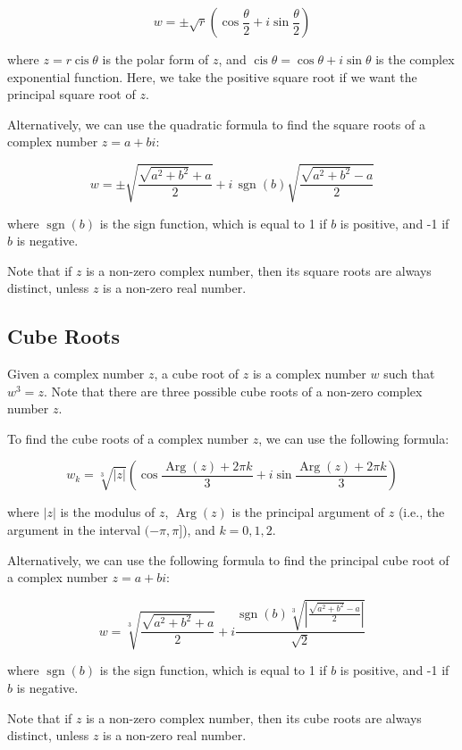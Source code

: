 \documentclass{article}
\begin{document}
$$w = \pm \sqrt{r}\left(\cos\frac{\theta}{2} + i\sin\frac{\theta}{2}\right)$$

where $z = r\operatorname{cis}\theta$ is the polar form of $z$, and
$\operatorname{cis}\theta = \cos\theta + i\sin\theta$ is the complex
exponential function. Here, we take the positive square root if we want the
principal square root of $z$.

Alternatively, we can use the quadratic formula to find the square roots of a
complex number $z = a + bi$:

$$w = \pm\sqrt{\frac{\sqrt{a^2 + b^2} + a}{2}} + i\,\operatorname{sgn}(b)\sqrt{\frac{\sqrt{a^2 + b^2} - a}{2}}$$

where $\operatorname{sgn}(b)$ is the sign function, which is equal to 1 if $b$
is positive, and -1 if $b$ is negative.

Note that if $z$ is a non-zero complex number, then its square roots are always
distinct, unless $z$ is a non-zero real number.



\subsection{Cube Roots}
Given a complex number $z$, a cube root of $z$ is a complex number $w$ such
that $w^3 = z$. Note that there are three possible cube roots of a non-zero
complex number $z$.

To find the cube roots of a complex number $z$, we can use the following
formula:

$$w_k = \sqrt[3]{|z|}\left(\cos\frac{\operatorname{Arg}(z) + 2\pi k}{3} + i\sin\frac{\operatorname{Arg}(z) + 2\pi k}{3}\right)$$

where $|z|$ is the modulus of $z$, $\operatorname{Arg}(z)$ is the principal
argument of $z$ (i.e., the argument in the interval $(-\pi,\pi]$), and $k = 0,
1, 2$.

Alternatively, we can use the following formula to find the principal cube root
of a complex number $z = a + bi$:

$$w = \sqrt[3]{\frac{\sqrt{a^2+b^2}+a}{2}} + i\frac{\operatorname{sgn}(b)\sqrt[3]{\left|\frac{\sqrt{a^2+b^2}-a}{2}\right|}}{\sqrt{2}}$$

where $\operatorname{sgn}(b)$ is the sign function, which is equal to 1 if $b$
is positive, and -1 if $b$ is negative.

Note that if $z$ is a non-zero complex number, then its cube roots are always
distinct, unless $z$ is a non-zero real number.
\end{document}
